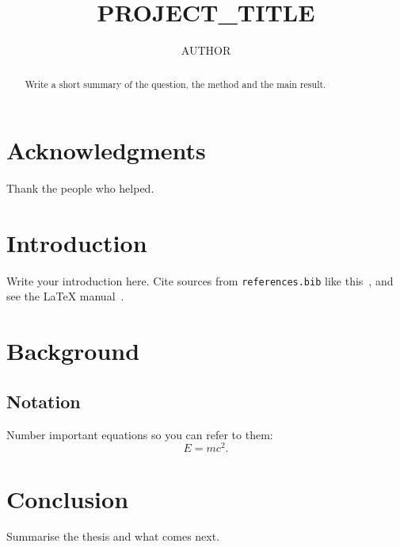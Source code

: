 \documentclass{uiucthesis}
\begin{document}
\title{{{PROJECT_TITLE}}}
\author{{{AUTHOR}}}
\phdthesis
{}
\maketitle

\frontmatter
\begin{abstract}
Write a short summary of the question, the method and the main result.
\end{abstract}

\chapter*{Acknowledgments}
Thank the people who helped.

\tableofcontents

\mainmatter
\chapter{Introduction}
Write your introduction here. Cite sources from \texttt{references.bib} like
this~\cite{einstein1905}, and see the \LaTeX{} manual~\cite{lamport1994}.

\chapter{Background}
\section{Notation}
Number important equations so you can refer to them:
\begin{equation}
  E = mc^2 . \label{eq:energy}
\end{equation}

\chapter{Conclusion}
Summarise the thesis and what comes next.



\end{document}
